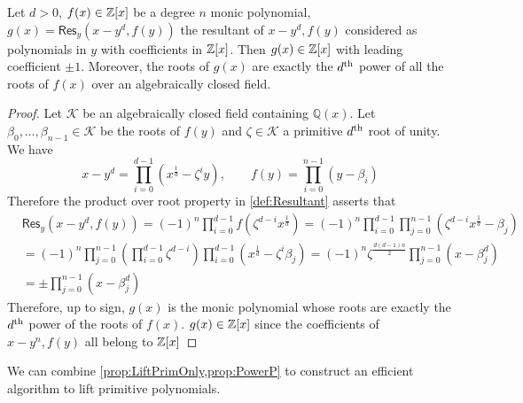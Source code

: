 \begin{proposition} \label{prop:PowerP}
    Let \(d > 0\), \(f(x) \in \mathbb{Z}[x]\) be a degree \(n\) monic polynomial, \(g(x) = \mathsf{Res}_y(x - y^d, f(y))\) the resultant of \(x - y^d, f(y)\) considered as polynomials in \(y\) with coefficients in \(\mathbb{Z}[x]\). Then \(g(x) \in \mathbb{Z}[x]\) with leading coefficient \(\pm 1\). Moreover, the roots of \(g(x)\) are exactly the \(d\textsuperscript{th}\) power of all the roots of \(f(x)\) over an algebraically closed field.
\end{proposition}
\begin{proof}
    Let \(\mathcal{K}\) be an algebraically closed field containing \(\mathbb{Q}(x)\). Let \(\beta_0, \ldots, \beta_{n-1} \in \mathcal{K}\) be the roots of \(f(y)\) and \(\zeta \in \mathcal{K}\) a primitive \(d\textsuperscript{th}\) root of unity. We have
    \[ x - y^d = \prod_{i=0}^{d-1} (x^{\frac{1}{d}} - \zeta^i y), \qquad 
    f(y) = \prod_{i=0}^{n-1} (y - \beta_i) \]
    Therefore the product over root property in \cref{def:Resultant} asserts that
    \begin{align*}
        &\mathsf{Res}_y(x-y^d, f(y)) = (-1)^n \prod_{i=0}^{d-1} f(\zeta^{d-i} x^{\frac{1}{d}}) = (-1)^n \prod_{i=0}^{d-1} \prod_{j=0}^{n-1}(\zeta^{d-i} x^{\frac{1}{d}} - \beta_j) \\
        &= (-1)^n \prod_{j=0}^{n-1}\left(\prod_{i=0}^{d-1}\zeta^{d-i}\right)\prod_{i=0}^{d-1}(x^{\frac{1}{d}} - \zeta^i \beta_j) = (-1)^n \zeta^{\frac{d(d-1)n}{2}} \prod_{j=0}^{n-1} (x - \beta_j^d) \\
        &= \pm \prod_{j=0}^{n-1}(x - \beta_j^d)
    \end{align*}
    Therefore, up to sign, \(g(x)\) is the monic polynomial whose roots are exactly the \(d\textsuperscript{th}\) power of the roots of \(f(x)\). \(g(x) \in \mathbb{Z}[x]\) since the coefficients of \(x - y^n, f(y)\) all belong to \(\mathbb{Z}[x]\)
\end{proof}

We can combine \cref{prop:LiftPrimOnly,prop:PowerP} to construct an efficient algorithm to lift primitive polynomials.

